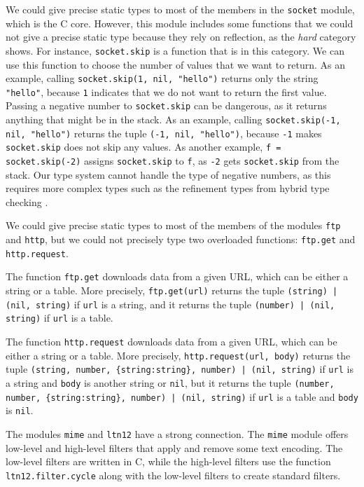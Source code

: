 We could give precise static types to most of the members
in the \texttt{socket} module, which is the C core.
However, this module includes some functions that
we could not give a precise static type because they
rely on reflection, as the \emph{hard} category shows.
For instance, \texttt{socket.skip} is a function that is
in this category.
We can use this function to choose the number of
values that we want to return.
As an example, calling \texttt{socket.skip(1, nil, "hello")}
returns only the string \texttt{"hello"}, because \texttt{1} indicates
that we do not want to return the first value.
Passing a negative number to \texttt{socket.skip} can be
dangerous, as it returns anything that might be in the stack.
As an example, calling \texttt{socket.skip(-1, nil, "hello")}
returns the tuple \texttt{(-1, nil, "hello")}, because \texttt{-1} makes
\texttt{socket.skip} does not skip any values.
As another example, \texttt{f = socket.skip(-2)} assigns \texttt{socket.skip}
to \texttt{f}, as \texttt{-2} gets \texttt{socket.skip} from the stack.
Our type system cannot handle the type of negative numbers, as
this requires more complex types such as the refinement types from
hybrid type checking \citep{flanagan2006htc}.

We could give precise static types to most of the members of the
modules \texttt{ftp} and \texttt{http}, but we could not precisely type
two overloaded functions: \texttt{ftp.get} and \texttt{http.request}.

The function \texttt{ftp.get} downloads data from a given URL,
which can be either a string or a table.
More precisely, \texttt{ftp.get(url)} returns the tuple
\texttt{(string) | (nil, string)} if \texttt{url} is a string,
and it returns the tuple \texttt{(number) | (nil, string)} if
\texttt{url} is a table.

The function \texttt{http.request} downloads data from a given URL,
which can be either a string or a table.
More precisely, \texttt{http.request(url, body)} returns the tuple
\texttt{(string, number, \{string:string\}, number) | (nil, string)}
if \texttt{url} is a string and \texttt{body} is another string or \texttt{nil},
but it returns the tuple
\texttt{(number, number, \{string:string\}, number) | (nil, string)}
if \texttt{url} is a table and \texttt{body} is \texttt{nil}.

The modules \texttt{mime} and \texttt{ltn12} have a strong connection.
The \texttt{mime} module offers low-level and high-level filters
that apply and remove some text encoding.
The low-level filters are written in C, while the high-level filters
use the function \texttt{ltn12.filter.cycle} along with the low-level
filters to create standard filters.

